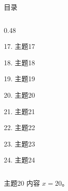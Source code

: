\documentclass[aspectratio=169,10pt,fontset=fandol]{ctexbeamer}
\begin{document}
\begin{frame}[t,fragile]{目录}
\begin{columns}[T,onlytextwidth]
\begin{column}{0.48\textwidth}
{\color{black}\small 17. 主题17\par}\vspace{0.22em}
{\color{black}\small 18. 主题18\par}\vspace{0.22em}
{\color{black}\small 19. 主题19\par}\vspace{0.22em}
{\color{blue}\small 20. 主题20\par}\vspace{0.22em}
{\color{gray!40}\small 21. 主题21\par}\vspace{0.22em}
{\color{gray!40}\small 22. 主题22\par}\vspace{0.22em}
{\color{gray!40}\small 23. 主题23\par}\vspace{0.22em}
{\color{gray!40}\small 24. 主题24\par}\vspace{0.22em}
\end{column}
\end{columns}
\end{frame}
\begin{frame}[t,fragile]{主题20}
\normalsize
{\normalsize
内容 $x=20$。
}
\end{frame}
\end{document}
